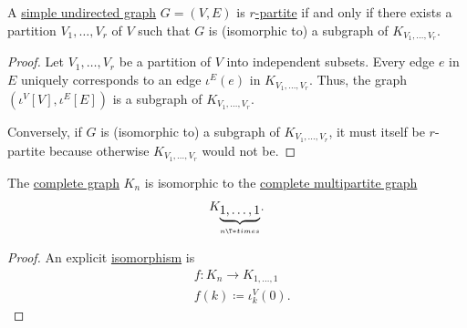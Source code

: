 \begin{proposition}\label{thm:complete_multipartite_subgraphs}
  A \hyperref[def:undirected_graph]{simple undirected graph} \( G = (V, E) \) is \hyperref[def:multipartite_graph]{\( r \)-partite} if and only if there exists a partition \( V_1, \ldots, V_r \) of \( V \) such that \( G \) is (isomorphic to) a subgraph of \( K_{V_1, \ldots, V_r} \).
\end{proposition}
\begin{proof}
  \SufficiencySubProof Let \( V_1, \ldots, V_r \) be a partition of \( V \) into independent subsets. Every edge \( e \) in \( E \) uniquely corresponds to an edge \( \iota^E(e) \) in \( K_{V_1, \ldots, V_r} \). Thus, the graph \( (\iota^V[V], \iota^E[E]) \) is a subgraph of \( K_{V_1, \ldots, V_r} \).

  \NecessitySubProof Conversely, if \( G \) is (isomorphic to) a subgraph of \( K_{V_1, \ldots, V_r} \), it must itself be \( r \)-partite because otherwise \( K_{V_1, \ldots, V_r} \) would not be.
\end{proof}

\begin{proposition}\label{thm:small_complete_multipartite_graph}
  The \hyperref[def:complete_graph]{complete graph} \( K_n \) is isomorphic to the \hyperref[def:complete_multipartite_graph]{complete multipartite graph}
  \begin{equation*}
    K_{\underbrace{1,\ldots,1}_{n \T*{times}}}.
  \end{equation*}
\end{proposition}
\begin{proof}
  An explicit \hyperref[def:undirected_graph/morphism]{isomorphism} is
  \begin{equation*}
    \begin{aligned}
      &f: K_n \to K_{1,\ldots,1} \\
      &f(k) \coloneqq \iota^V_k(0).
    \end{aligned}
  \end{equation*}
\end{proof}

